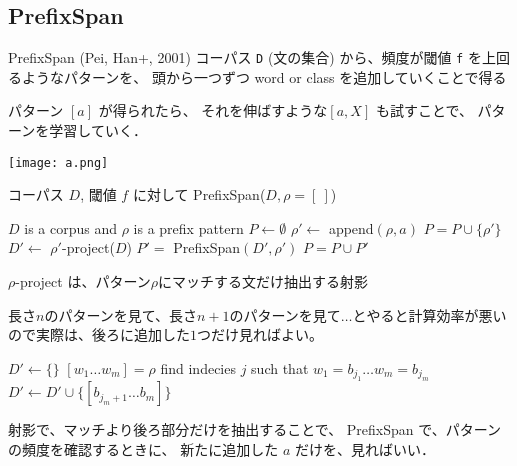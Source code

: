 \documentclass[12pt, dvipdfmx, default, cjk]{beamer}
\begin{document}
\subsection{PrefixSpan}

\begin{frame}{PrefixSpan (Pei, Han+, 2001)}
  コーパス \texttt{D} (文の集合) から、頻度が閾値 \texttt{f} を上回るようなパターンを、
  頭から一つずつ word or class を追加していくことで得る

  パターン $[a]$ が得られたら、
  それを伸ばすような$[a,X]$ も試すことで、
  パターンを学習していく．

  \center
  \texttt{[image: a.png]}
\end{frame}

\begin{frame}[fragile]

  コーパス $D$,
  閾値 $f$
  に対して
  PrefixSpan($D, \rho=[~]$)

  \begin{algorithm}[H]
    \begin{algorithmic}[1]
      \REQUIRE $D$ is a corpus and $\rho$ is a prefix pattern
      \STATE $P \leftarrow \emptyset$
        \STATE $\rho' \leftarrow $ append$(\rho, a)$
        \STATE $P = P \cup \{\rho'\}$
        \STATE $D' \leftarrow $ $\rho'$-project($D$)
        \STATE $P' = $ PrefixSpan$(D', \rho')$
        \STATE $P = P \cup P'$
        \ENDIF
      \ENDFOR
    \end{algorithmic}
    \caption{PrefixSpan($D, \rho$)}
    \label{alg:seq}
  \end{algorithm}

  $\rho$-project は、パターン$\rho$にマッチする文だけ抽出する射影

\end{frame}

\begin{frame}
  長さ$n$のパターンを見て、長さ$n+1$のパターンを見て$\dots$とやると計算効率が悪いので実際は、後ろに追加した$1$つだけ見ればよい。

\end{frame}

\begin{frame}
  \begin{algorithm}[H]
    \begin{algorithmic}
      \STATE $D' \leftarrow \{\}$
      \STATE $[w_1 \dots w_m] = \rho$
      \STATE find indecies $j$ such that
      \STATE $w_1 = b_{j_1} \dots w_m = b_{j_m}$
      \STATE $D' \leftarrow D' \cup \{[b_{j_m + 1} \dots b_m]\}$
      \ENDIF
      \ENDFOR
    \end{algorithmic}
    \caption{$\rho$-project($D$)}
  \end{algorithm}
  射影で、マッチより後ろ部分だけを抽出することで、
  PrefixSpan で、パターンの頻度を確認するときに、
  新たに追加した $a$ だけを、見ればいい．

\end{frame}
\end{document}
